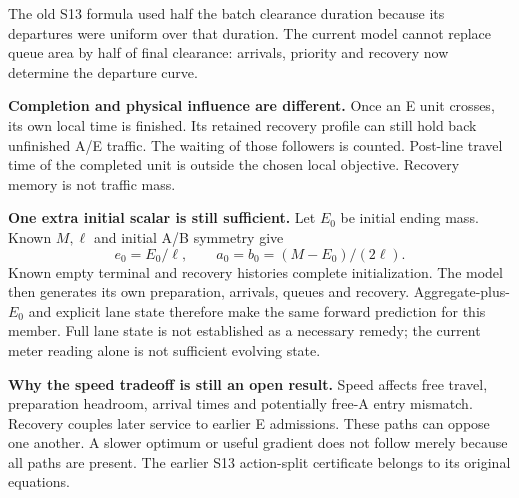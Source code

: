 \documentclass[11pt,a4paper]{article}
\begin{document}
The old S13 formula used half the batch clearance duration because its
departures were uniform over that duration. The current model cannot
replace queue area by half of final clearance: arrivals, priority and
recovery now determine the departure curve.

\textbf{Completion and physical influence are different.} Once an E unit
crosses, its own local time is finished. Its retained recovery profile can
still hold back unfinished A/E traffic. The waiting of those followers is
counted. Post-line travel time of the completed unit is outside the chosen
local objective. Recovery memory is not traffic mass.

\textbf{One extra initial scalar is still sufficient.} Let $E_0$ be
initial ending mass. Known $M,\ell$ and initial A/B symmetry give
\[
 e_0=E_0/\ell,\qquad a_0=b_0=(M-E_0)/(2\ell).
\]
Known empty terminal and recovery histories complete initialization. The
model then generates its own preparation, arrivals, queues and recovery.
Aggregate-plus-$E_0$ and explicit lane state therefore make the same
forward prediction for this member. Full lane state is not established
as a necessary remedy; the current meter reading alone is not sufficient
evolving state.

\textbf{Why the speed tradeoff is still an open result.} Speed affects
free travel, preparation headroom, arrival times and potentially free-A
entry mismatch. Recovery couples later service to earlier E admissions.
These paths can oppose one another. A slower optimum or useful gradient
does not follow merely because all paths are present. The earlier S13
action-split certificate belongs to its original equations.

\newpage
\end{document}
